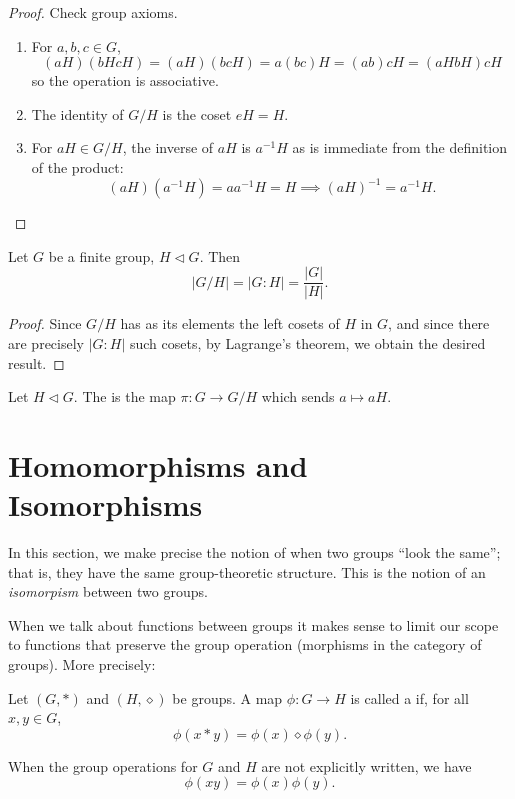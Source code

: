\begin{proof}
Check group axioms.
\begin{enumerate}[label=(\roman*)]
\item For $a,b,c\in G$,
\[(aH)(bHcH)=(aH)(bcH)=a(bc)H=(ab)cH=(aHbH)cH\]
so the operation is associative.
\item The identity of $G/H$ is the coset $eH=H$.
\item For $aH\in G/H$, the inverse of $aH$ is $a^{-1}H$ as is immediate from the definition of the product:
\[(aH)(a^{-1}H)=aa^{-1}H=H\implies(aH)^{-1}=a^{-1}H.\]
\end{enumerate}
\end{proof}

\begin{lemma}
Let $G$ be a finite group, $H\triangleleft G$. Then
\[|G/H|=|G:H|=\frac{|G|}{|H|}.\]
\end{lemma}

\begin{proof}
Since $G/H$ has as its elements the left cosets of $H$ in $G$, and since there are precisely $|G:H|$ such cosets, by Lagrange's theorem, we obtain the desired result.
\end{proof}

\begin{definition}
Let $H\triangleleft G$. The  is the map $\pi:G\to G/H$ which sends $a\mapsto aH$.
\end{definition}
\pagebreak

\section{Homomorphisms and Isomorphisms}
In this section, we make precise the notion of when two groups ``look the same''; that is, they have the same group-theoretic structure. This is the notion of an \emph{isomorpism} between two groups.

When we talk about functions between groups it makes sense to limit our scope to functions that preserve the group operation (morphisms in the category of groups). More precisely:

\begin{definition}[Homomorphism]
Let $(G,\ast)$ and $(H,\diamond)$ be groups. A map $\phi:G\to H$ is called a  if, for all $x,y\in G$,
\[\phi(x\ast y)=\phi(x)\diamond\phi(y).\]
\end{definition}

When the group operations for $G$ and $H$ are not explicitly written, we have
\[\phi(xy)=\phi(x)\phi(y).\]

